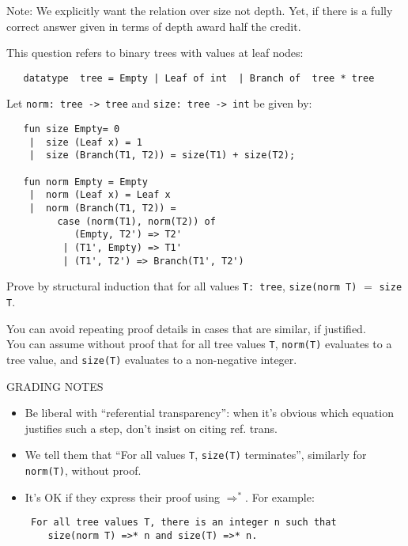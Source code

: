 \documentclass[answers,addpoints,12pt]{exam}
\begin{document}
\begin{questions}
\begin{parts}
\begin{solution}[18em]
Note: We explicitly want the relation over size not depth. Yet, if there is a fully correct answer given in terms of depth award half the credit.
\end{solution}
\end{parts}


\newpage


This question refers to binary trees with values at leaf nodes:
\begin{verbatim}
   datatype  tree = Empty | Leaf of int  | Branch of  tree * tree
\end{verbatim}

Let {\tt norm: tree -> tree} and {\tt size: tree -> int} be given by:
\begin{verbatim}   
   fun size Empty= 0
    |  size (Leaf x) = 1
    |  size (Branch(T1, T2)) = size(T1) + size(T2);

   fun norm Empty = Empty
    |  norm (Leaf x) = Leaf x
    |  norm (Branch(T1, T2)) =
         case (norm(T1), norm(T2)) of
            (Empty, T2') => T2'
          | (T1', Empty) => T1'
          | (T1', T2') => Branch(T1', T2')
\end{verbatim}
Prove by structural induction that for all values {\tt T: tree},
\verb|size(norm T)| $=$ \verb|size T|.

You can avoid repeating proof details in cases that are similar, if justified.\\
You can assume without proof that for all tree values {\tt T},
{\tt norm(T)} evaluates to a tree value, and {\tt size(T)} evaluates to a non-negative integer.

\begin{solution}
GRADING NOTES
\begin{itemize}
\item  Be liberal with ``referential transparency'':  when it's obvious which equation 
justifies such a step, don't insist on citing ref. trans.
\item We tell them that
``For all values {\tt T}, {\tt size(T)} terminates'', similarly for {\tt norm(T)}, without proof.

\item It's OK if they express their proof using $\Longrightarrow^\ast$. For example:
\begin{verbatim}
 For all tree values T, there is an integer n such that 
    size(norm T) =>* n and size(T) =>* n.
\end{verbatim}


\end{itemize}
\end{solution}
\end{questions}
\end{document}
